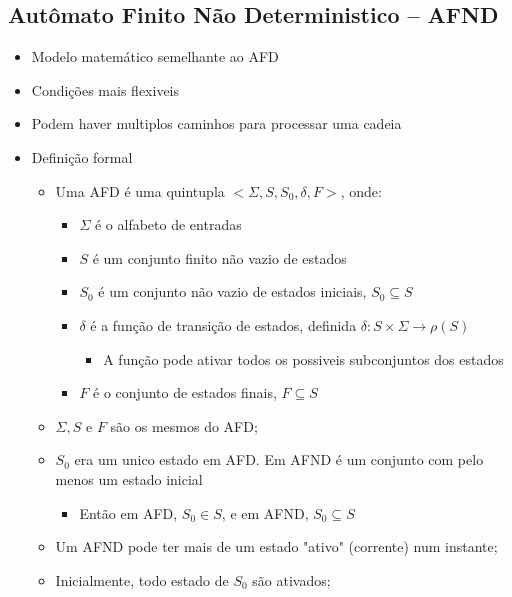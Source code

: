 \documentclass[12pt]{article}
\begin{document}
    \subsection{Autômato Finito Não Deterministico -- AFND}
    \begin{itemize}
        \item Modelo matemático semelhante ao AFD
        \item Condições mais flexiveis
        \item Podem haver multiplos caminhos para processar uma cadeia
        \item Definição formal
        \begin{itemize}
            \item Uma AFD é uma quintupla $<\Sigma, S, S_0, \delta, F>$, 
                    onde:
            \begin{itemize}
                \item $\Sigma$ é o alfabeto de entradas
                \item $S$ é um conjunto finito não vazio de estados
                \item $S_0$ é um conjunto não vazio de estados iniciais, $S_0 
                \subseteq S$
                \item $\delta$ é a função de transição de estados, definida 
                $\delta:S \times \Sigma \rightarrow \rho(S)$
                \begin{itemize}
                    \item A função pode ativar todos os possiveis subconjuntos 
                    dos estados
                \end{itemize}
                \item $F$ é o conjunto de estados finais, $F \subseteq S$
            \end{itemize}
            \item $\Sigma, S$ e $F$ são os mesmos do AFD;
            \item $S_0$ era um unico estado em AFD. Em AFND é um conjunto com 
            pelo menos um estado inicial
            \begin{itemize}
                \item Então em AFD, $S_0 \in S$, e em AFND, $S_0 \subseteq S$
            \end{itemize}
            \item Um AFND pode ter mais de um estado "ativo" (corrente) num 
            instante;
            \item Inicialmente, todo estado de $S_0$ são ativados;

\end{itemize}
\end{itemize}
\end{document}
